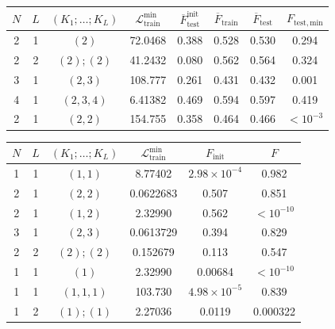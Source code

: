 %
\begin{tabular}{ccc ccccc}
\hline
$N$ & $L$ & $(K_1;\ldots;K_L)$ & $\mathcal L_{\mathrm{train}}^{\min}$ & $\overline F_{\mathrm{test}}^{\mathrm{init}}$ & $\overline F_{\mathrm{train}}$ & $\overline F_{\mathrm{test}}$ & $F_{\mathrm{test,min}}$ \\
\hline
2 & 1 & $(2)$       & 72.0468 & 0.388 & 0.528 & 0.530 & 0.294 \\
2 & 2 & $(2);(2)$    & 41.2432 & 0.080 & 0.562 & 0.564 & 0.324 \\
3 & 1 & $(2,3)$     & 108.777 & 0.261 & 0.431 & 0.432 & 0.001 \\
4 & 1 & $(2,3,4)$   & 6.41382 & 0.469 & 0.594 & 0.597 & 0.419 \\
2 & 1 & $(2,2)$     & 154.755 & 0.358 & 0.464 & 0.466 & $<10^{-3}$ \\
\hline
\end{tabular}


\begin{tabular}{ccc ccc}
\hline
$N$ & $L$ & $(K_1;\ldots;K_L)$ & $\mathcal L_{\mathrm{train}}^{\min}$ & $F_{\mathrm{init}}$ & $F$ \\
\hline
1 & 1 & $(1,1)$     & 8.77402   & $2.98\times10^{-4}$ & 0.982 \\
2 & 1 & $(2,2)$     & 0.0622683 & 0.507 & 0.851 \\
2 & 1 & $(1,2)$     & 2.32990   & 0.562 & $<10^{-10}$ \\
3 & 1 & $(2,3)$     & 0.0613729 & 0.394 & 0.829 \\
2 & 2 & $(2);(2)$   & 0.152679  & 0.113 & 0.547 \\
1 & 1 & $(1)$       & 2.32990   & 0.00684 & $<10^{-10}$ \\
1 & 1 & $(1,1,1)$   & 103.730   & $4.98\times10^{-5}$ & 0.839 \\
1 & 2 & $(1);(1)$   & 2.27036   & 0.0119 & 0.000322 \\
\hline
\end{tabular}

